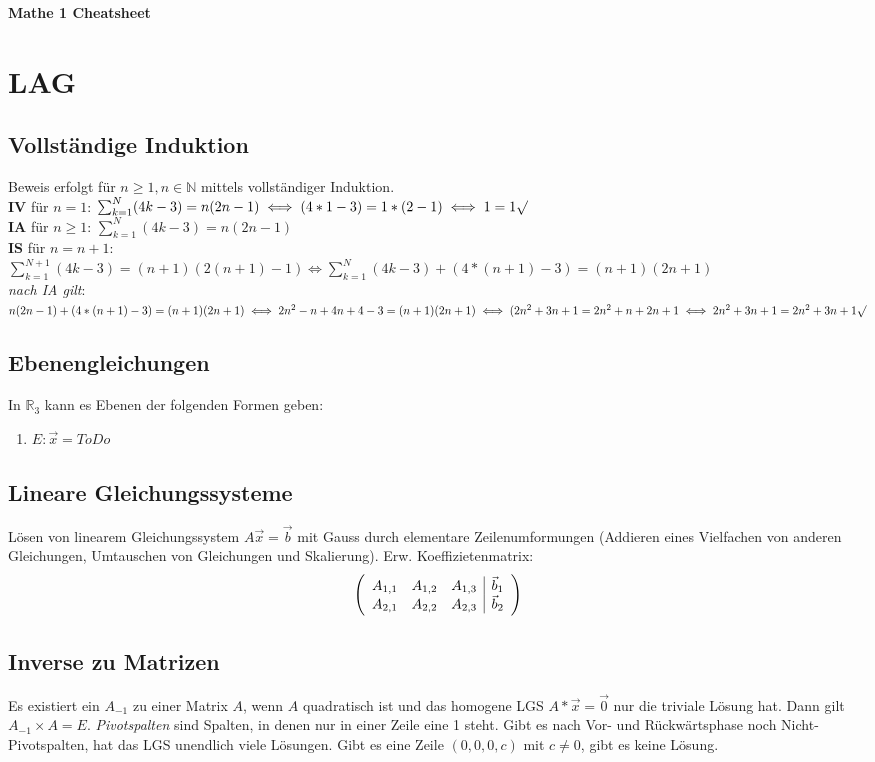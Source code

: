 \documentclass[12pt,landscape]{article}
\begin{document}
\raggedright
\footnotesize
\begin{multicols}{3}

\begin{center}
     \Large{\textbf{Mathe 1 Cheatsheet}}
\end{center}

\section{LAG}
\subsection{Vollständige Induktion}
Beweis erfolgt für $n \geq 1, n \in{\mathbb{N}}$ mittels vollständiger Induktion.\\
\textbf{IV} für $n = 1$: $\sum_{k=1}^N(4k-3) = n(2n - 1) \iff (4*1-3) = 1*(2-1) \iff 1 = 1 \surd$ \\
\textbf{IA} für $n \geq 1$: $\sum_{k=1}^N(4k-3) = n(2n-1)$\\
\textbf{IS} für $n = n + 1:$\\
$\sum_{k=1}^{N+1}(4k-3) = (n+1)(2(n+1)-1) \iff \sum_{k=1}^{N}(4k-3) + (4*(n+1)-3) = (n+1)(2n+1)$\\
\textit{nach IA gilt}:\\
$n(2n-1)+(4*(n+1)-3)=(n+1)(2n+1)\iff
2n^2-n+4n+4-3=(n+1)(2n+1) \iff
(2n^2+3n+1 = 2n^2 + n + 2n + 1 \iff 2n^2 + 3n + 1 = 2n^2 + 3n + 1 \surd$
\subsection{Ebenengleichungen}
In $\mathbb{R}_3$ kann es Ebenen der folgenden Formen geben:
\begin{enumerate}
\item $E: \vec{x} = ToDo$
\end{enumerate}
\subsection{Lineare Gleichungssysteme}
Lösen von linearem Gleichungssystem $A\vec{x}=\vec{b}$ mit Gauss durch elementare Zeilenumformungen (Addieren eines Vielfachen von anderen Gleichungen, Umtauschen von Gleichungen und Skalierung). Erw. Koeffizietenmatrix:
\[\begin{array}({ccc|c})
  A_{1,1} & A_{1,2} & A_{1,3} & \vec{b}_1\\
  A_{2,1} & A_{2,2} & A_{2,3} & \vec{b}_2
\end{array}\]
\subsection{Inverse zu Matrizen}
Es existiert ein $A_{-1}$ zu einer Matrix $A$, wenn $A$ quadratisch ist und das homogene LGS $A * \vec{x} = \vec{0}$ nur die triviale Lösung hat. Dann gilt $A_{-1} \times A = E$.
\textit{Pivotspalten} sind Spalten, in denen nur in einer Zeile eine 1 steht. Gibt es nach Vor- und Rückwärtsphase noch Nicht-Pivotspalten, hat das LGS unendlich viele Lösungen. Gibt es eine Zeile $(0,0,0,c)$ mit $c \neq 0$, gibt es keine Lösung.

\end{multicols}
\end{document}
